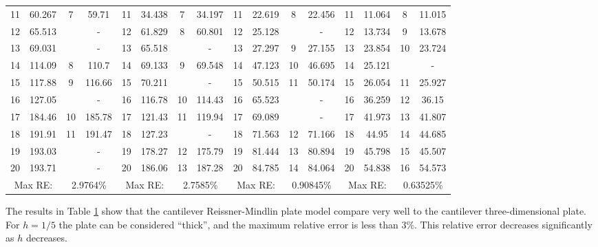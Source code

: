 \documentclass[../../main.tex]{subfiles}
\begin{document}
\begin{table}[htbp]
{{\begin{tabular}{|cccc||cccc||cccc||cccc|}
			11    & 60.267 & 7     & {59.71} & 11    & 34.438 & 7     & 34.197 & 11    & 22.619 & 8     & 22.456 & 11    & 11.064 & 8     & 11.015 \\
			12    & 65.513 &       & -     & 12    & 61.829 & 8     & 60.801 & 12    & 25.128 &       & {-} & 12    & 13.734 & 9     & 13.678 \\
			13    & 69.031 &       & -     & 13    & 65.518 &       & {-} & 13    & 27.297 & 9     & 27.155 & 13    & 23.854 & 10    & 23.724 \\
			14    & 114.09 & 8     & {110.7} & 14    & 69.133 & 9     & 69.548 & 14    & 47.123 & 10    & 46.695 & 14    & 25.121 &       & {-} \\
			15    & 117.88 & 9     & {116.66} & 15    & 70.211 &       & {-} & 15    & 50.515 & 11    & 50.174 & 15    & 26.054 & 11    & 25.927 \\
			16    & 127.05 &       & -     & 16    & 116.78 & 10    & 114.43 & 16    & 65.523 &       & {-} & 16    & 36.259 & 12    & 36.15 \\
			17    & 184.46 & 10    & {185.78} & 17    & 121.43 & 11    & 119.94 & 17    & 69.089 &       & {-} & 17    & 41.973 & 13    & 41.807 \\
			18    & 191.91 & 11    & {191.47} & 18    & 127.23 &       & {-} & 18    & 71.563 & 12    & 71.166 & 18    & 44.95 & 14    & 44.685 \\
			19    & 193.03 &       & -     & 19    & 178.27 & 12    & 175.79 & 19    & 81.444 & 13    & 80.894 & 19    & 45.798 & 15    & 45.507 \\
			20    & 193.71 &       & -     & 20    & 186.06 & 13    & 187.28 & 20    & 84.785 & 14    & 84.064 & 20    & 54.838 & 16    & 54.573 \\
			\hline
			\multicolumn{2}{|c}{Max RE:} & \multicolumn{2}{c||}{2.9764\%} & \multicolumn{2}{c}{Max RE:} & \multicolumn{2}{c||}{2.7585\%} & \multicolumn{2}{c}{Max RE:} & \multicolumn{2}{c||}{0.90845\%} & \multicolumn{2}{c}{Max RE:} & \multicolumn{2}{c|}{0.63525\%} \\
			\hline
		\end{tabular}%
		\label{tab:Table_plate_1}%
	}}
\end{table}%
\FloatBarrier

The results in Table \ref{tab:Table_plate_1} show that the cantilever Reissner-Mindlin plate model compare very well to the cantilever three-dimensional plate. For $h = 1/5$ the plate can be considered ``thick'', and the maximum relative error is less than $3\%$. This relative error decreases significantly as $h$ decreases.\\
\end{document}
